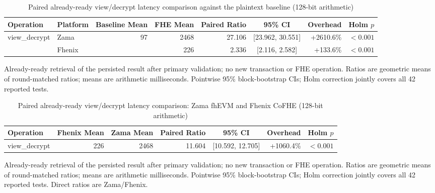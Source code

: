 \begin{table}[!t]
\caption{Paired already-ready view/decrypt latency comparison against the plaintext baseline (128-bit arithmetic)}
\label{tab:paired-lifecycle-comparison-view-128}
\centering
\footnotesize
\setlength{\tabcolsep}{5pt}
\begin{tabular}{|l|l|r|r|r|c|r|r|}
\hline
\textbf{Operation} & \textbf{Platform} & \textbf{Baseline Mean} & \textbf{FHE Mean} & \textbf{Paired Ratio} & \textbf{95\% CI} & \textbf{Overhead} & \textbf{Holm \(p\)} \\
\hline
\multirow{2}{*}{view\_decrypt}
& Zama & \multirow{2}{*}{97} & 2468 & 27.106 & [23.962, 30.551] & +2610.6\% & $<0.001$ \\
& Fhenix &  & 226 & 2.336 & [2.116, 2.582] & +133.6\% & $<0.001$ \\
\hline
\hline
\end{tabular}
\vspace{2pt}
\parbox{\textwidth}{\scriptsize Already-ready retrieval of the persisted result after primary validation; no new transaction or FHE operation. Ratios are geometric means of round-matched ratios; means are arithmetic milliseconds. Pointwise 95\% block-bootstrap CIs; Holm correction jointly covers all 42 reported tests.}
\end{table}

\begin{table}[!t]
\caption{Paired already-ready view/decrypt latency comparison: Zama fhEVM and Fhenix CoFHE (128-bit arithmetic)}
\label{tab:zama-fhenix-lifecycle-comparison-view-128}
\centering
\footnotesize
\setlength{\tabcolsep}{5pt}
\begin{tabular}{|l|r|r|r|c|r|r|}
\hline
\textbf{Operation} & \textbf{Fhenix Mean} & \textbf{Zama Mean} & \textbf{Paired Ratio} & \textbf{95\% CI} & \textbf{Overhead} & \textbf{Holm \(p\)} \\
\hline
view\_decrypt & 226 & 2468 & 11.604 & [10.592, 12.705] & +1060.4\% & $<0.001$ \\
\hline
\end{tabular}
\vspace{2pt}
\parbox{\textwidth}{\scriptsize Already-ready retrieval of the persisted result after primary validation; no new transaction or FHE operation. Ratios are geometric means of round-matched ratios; means are arithmetic milliseconds. Pointwise 95\% block-bootstrap CIs; Holm correction jointly covers all 42 reported tests. Direct ratios are Zama/Fhenix.}
\end{table}
